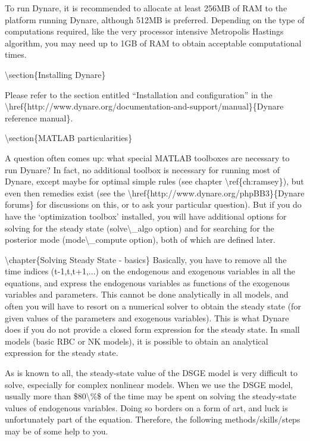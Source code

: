 \documentclass[10pt,math=newtx,citestyle=gb7714-2015,bibstyle=gb7714-2015]{elegantbook}
\begin{document}
	To run Dynare, it is recommended to allocate at least 256MB of RAM to the platform running Dynare, although 512MB is preferred. Depending on the type of computations required, like the very processor intensive Metropolis Hastings algorithm, you may need up to 1GB of RAM to obtain acceptable computational times.
	
	\textbackslash{}section\{Installing Dynare\}
	
	Please refer to the section entitled ``Installation and configuration'' in the \textbackslash{}href\{http://www.dynare.org/documentation-and-support/manual\}\{Dynare reference manual\}.
	
	\textbackslash{}section\{MATLAB particularities\}
	
	A question often comes up: what special MATLAB toolboxes are necessary to run Dynare? In fact, no additional toolbox is necessary for running most of Dynare, except maybe for optimal simple rules (see chapter \textbackslash{}ref\{ch:ramsey\}), but even then remedies exist (see the \textbackslash{}href\{http://www.dynare.org/phpBB3\}\{Dynare forums\} for discussions on this, or to ask your particular question). But if you do have the `optimization toolbox' installed, you will have additional options for solving for the steady state (solve\textbackslash{}\_algo option) and for searching for the posterior mode (mode\textbackslash{}\_compute option), both of which are defined later. 
	
	\textbackslash{}chapter\{Solving Steady State - basics\}
	Basically, you have to remove all the time indices (t-1,t,t+1,...) on the endogenous and exogenous variables in all the equations, and express the endogenous variables as functions of the exogenous variables and parameters. This cannot be done analytically in all models, and often you will have to resort on a numerical solver to obtain the steady state (for given values of the parameters and exogenous variables). This is what Dynare does if you do not provide a closed form expression for the steady state. In small models (basic RBC or NK models), it is possible to obtain an analytical expression for the steady state.
	
	As is known to all, the steady-state value of the DSGE model is very difficult to solve, especially for complex nonlinear models. When we use the DSGE model, usually more than \$80\textbackslash{}\%\$ of the time may be spent on solving the steady-state values of endogenous variables. Doing so borders on a form of art, and luck is unfortunately part of the equation. Therefore, the following methods/skills/steps may be of some help to you.
	
\end{document}
